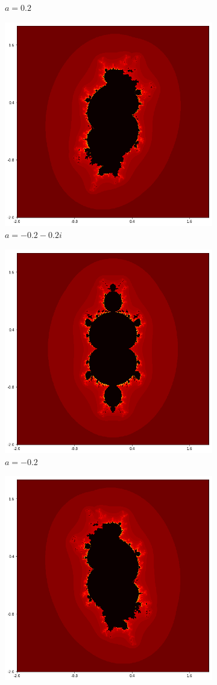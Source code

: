 \documentclass{amsart}
\theoremstyle{definition}
\theoremstyle{remark}
\numberwithin{equation}{section}
\begin{document}
\begin{figure}[h]
\begin{subfigure}{.32\textwidth}
  \caption{$a=0.2$}
\end{subfigure}
\begin{subfigure}{.32\textwidth}
  \centering
  \includegraphics[width=0.7\linewidth]{ShiftLocus3a7.png}
  \caption{$a=-0.2-0.2i$}
\end{subfigure}
\begin{subfigure}{.32\textwidth}
  \centering
  \includegraphics[width=0.7\linewidth]{ShiftLocus3a8.png}
  \caption{$a=-0.2$}
\end{subfigure}
\begin{subfigure}{.32\textwidth}
  \centering
  \includegraphics[width=0.7\linewidth]{ShiftLocus3a9.png}

\end{subfigure}
\end{figure}
\end{document}
